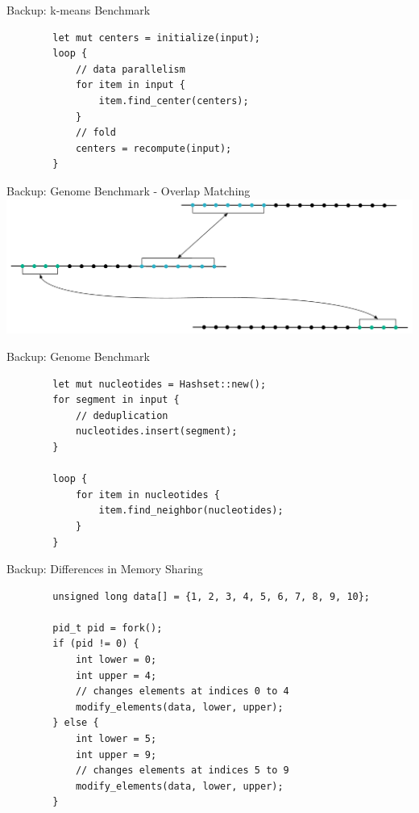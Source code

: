 \documentclass[aspectratio=169, usenames, dvipsnames]{beamer}
\begin{document}
\begin{frame}[fragile]{Backup: k-means Benchmark}
    \centering
    \begin{verbatim}
        let mut centers = initialize(input);
        loop {
            // data parallelism
            for item in input {
                item.find_center(centers);
            }
            // fold
            centers = recompute(input);
        }
    \end{verbatim}
\end{frame}

\begin{frame}{Backup: Genome Benchmark - Overlap Matching}
    \centering
    \includegraphics[width=\textwidth,keepaspectratio]{img/experiments-genome}
\end{frame}

\begin{frame}[fragile]{Backup: Genome Benchmark}
    \centering
    \begin{verbatim}
        let mut nucleotides = Hashset::new();
        for segment in input {
            // deduplication
            nucleotides.insert(segment);
        }

        loop {
            for item in nucleotides {
                item.find_neighbor(nucleotides);
            }
        }
    \end{verbatim}
\end{frame}

\begin{frame}[fragile]{Backup: Differences in Memory Sharing}
    \begin{verbatim}
        unsigned long data[] = {1, 2, 3, 4, 5, 6, 7, 8, 9, 10};

        pid_t pid = fork();
        if (pid != 0) {
            int lower = 0;
            int upper = 4;
            // changes elements at indices 0 to 4
            modify_elements(data, lower, upper);
        } else {
            int lower = 5;
            int upper = 9;
            // changes elements at indices 5 to 9
            modify_elements(data, lower, upper);
        }
    \end{verbatim}

\end{frame}
\end{document}
